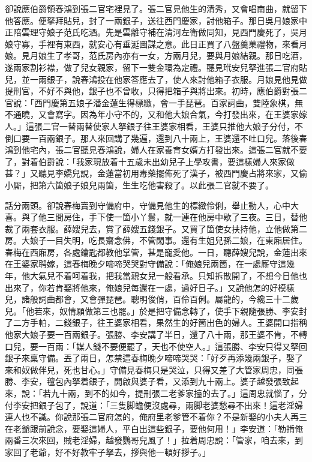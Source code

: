 卻說應伯爵領春鴻到張二官宅裡見了。張二官見他生的清秀，又會唱南曲，就留下他答應。便拏拜貼兒，封了一兩銀子，送往西門慶家，討他箱子。那日吳月娘家中正陪雲理守娘子范氏吃酒。先是雲離守補在清河左衛做同知，見西門慶死了，吳月娘守寡，手裡有東西，就安心有垂涎圖謀之意。{}此日正買了八盤羹菓禮物，來看月娘。見月娘生了孝哥，范氏房內亦有一女，方兩月兒，要與月娘結親。那日吃酒，遂兩家割衫襟，做了兒女親家，留下一雙金環為定禮。聽見玳安兒拏進張二官府貼兒，並一兩銀子，說春鴻投在他家答應去了，使人來討他箱子衣服。月娘見他見做提刑官，不好不與他，銀子也不曾收，只得把箱子與將出來。初時，應伯爵對張二官說：「西門慶第五娘子潘金蓮生得標緻，會一手琵琶。百家詞曲，雙陸象棋，無不通曉，又會寫字。因為年小守不的，又和他大娘合氣，今打發出來，在王婆家嫁人。」這張二官一替兩替使家人拏銀子往王婆家相看，王婆只推他大娘子分付，不倒口要一百兩銀子。那人來回講了幾遍，還到八十兩上，王婆還不吐口兒。落後春鴻到他宅內，張二官聽見春鴻說，婦人在家養育女婿方打發出來。這張二官就不要了，對着伯爵說：「我家現放着十五歲未出幼兒子上學攻書，要這樣婦人來家做甚？」又聽見李嬌兒說，{}金蓮當初用毒藥擺佈死了漢子，被西門慶占將來家，又偷小厮，把第六箇娘子娘兒兩箇，生生吃他害殺了。以此張二官就不要了。

話分兩頭。卻說春梅賣到守備府中，守備見他生的標緻伶俐，舉止動人，心中大喜。與了他三間房住，手下使一箇小丫鬟，就一連在他房中歇了三夜。三日，替他裁了兩套衣服。薛嫂兒去，賞了薛嫂五錢銀子。又買了箇使女扶持他，立他做第二房。大娘子一目失明，吃長齋念佛，不管閑事。還有生姐兒孫二娘，在東廂居住。春梅在西廂房，各處鑰匙都教他掌管，甚是寵愛他。一日，聽薛嫂兒說，金蓮出來在王婆家聘嫁，這春梅晚夕啼啼哭哭對守備說：「俺娘兒兩箇，在一處厮守這幾年，他大氣兒不着呵着我，把我當親女兒一般看承。只知拆散開了，不想今日他也出來了，你若肯娶將他來，俺娘兒每還在一處，過好日子。」又說他怎的好模樣兒，諸般詞曲都會，又會彈琵琶。聰明俊俏，百伶百俐。屬龍的，今纔三十二歲兒。「他若來，奴情願做第三也罷。」{}於是把守備念轉了，使手下親隨張勝、李安封了二方手帕，二錢銀子，往王婆家相看，果然生的好箇出色的婦人。王婆開口指稱他家大娘子要一百兩銀子。張勝、李安講了半日，還了八十兩，那王婆不肯，不轉口兒，要一百兩：「媒人錢不要便罷了，天也不使空人。」{}這張勝、李安只得又拏回銀子來稟守備。丟了兩日，怎禁這春梅晚夕啼啼哭哭：「好歹再添幾兩銀子，娶了來和奴做伴兒，死也甘心。」守備見春梅只是哭泣，只得又差了大管家周忠，同張勝、李安，氊包內拏着銀子，開啟與婆子看，又添到九十兩上。婆子越發張致起來，說：「若九十兩，到不的如今，提刑張二老爹家擡的去了。」這周忠就惱了，分付李安把銀子包了，說道：「三隻脚蟾便沒處尋，兩脚老婆愁尋不出來！這老淫婦連人也不識。你說那張二官府怎的，俺府里老爹管不着你？不是新娶的小夫人再三在老爺跟前說念，要娶這婦人，平白出這些銀子，要他何用！」李安道：「勒掯俺兩番三次來回，賊老淫婦，越發鸚哥兒風了！」拉着周忠說：「管家，咱去來，到家回了老爺，好不好教牢子拏去，拶與他一頓好拶子。」

